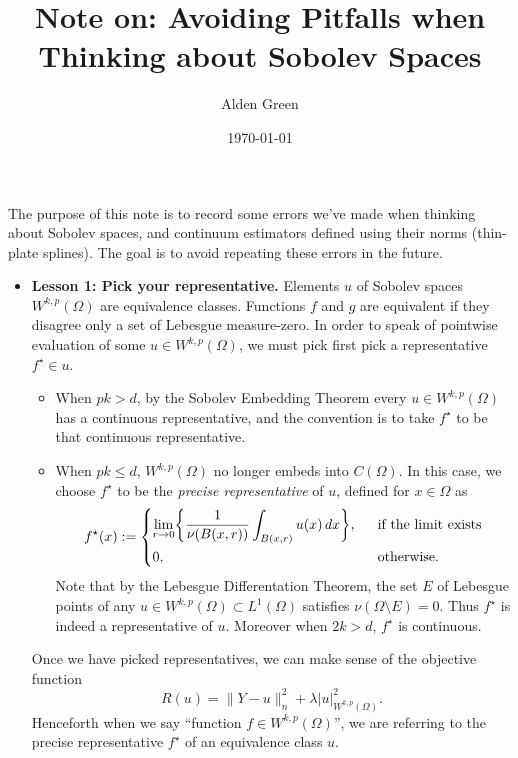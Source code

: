 \documentclass{article}
\newcommand{\1}{\mathbf{1}}
\theoremstyle{alden}
\theoremstyle{aldenthm}
\theoremstyle{definition}
\theoremstyle{remark}
\begin{document}
\title{Note on: Avoiding Pitfalls when Thinking about Sobolev Spaces}
\author{Alden Green}
\date{\today}
\maketitle

The purpose of this note is to record some errors we've made when thinking about Sobolev spaces, and continuum estimators defined using their norms (thin-plate splines). The goal is to avoid repeating these errors in the future.

\begin{itemize}
	\item \textbf{Lesson 1: Pick your representative.} Elements $u$ of Sobolev spaces $W^{k,p}(\Omega)$ are equivalence classes. Functions $f$ and $g$ are equivalent if they disagree only a set of Lebesgue measure-zero. In order to speak of pointwise evaluation of some $u \in W^{k,p}(\Omega)$, we must pick first pick a representative $f^{\star} \in u$. 
	\begin{itemize}
		\item When $pk > d$, by the Sobolev Embedding Theorem every $u \in W^{k,p}(\Omega)$ has a continuous representative, and the convention is to take $f^{\star}$ to be that continuous representative.
		\item When $pk \leq d$, $W^{k,p}(\Omega)$ no longer embeds into $C(\Omega)$. In this case, we choose $f^{\star}$ to be the \emph{precise representative} of $u$, defined for $x \in \Omega$ as
		\begin{equation*}
		f^{\star}(x) :=
		\begin{dcases}
		\lim_{r \to 0} \biggl\{\frac{1}{\nu(B(x,r))} \int_{B(x,r)} u(x) \,dx\biggr\},& ~~\textrm{if the limit exists} \\
		0,& ~~\textrm{otherwise.}
		\end{dcases}
		\end{equation*}
		Note that by the Lebesgue Differentation Theorem, the set $E$ of Lebesgue points of any $u \in W^{k,p}(\Omega) \subset L^1(\Omega)$ satisfies $\nu(\Omega\setminus E) = 0$. Thus $f^{\star}$ is indeed a representative of $u$. Moreover when $2k > d$, $f^{\star}$ is continuous. 
	\end{itemize}
	Once we have picked representatives, we can make sense of the objective function
	\begin{equation*}
	R(u) = \|Y - u\|_n^2 + \lambda |u|_{W^{k,p}(\Omega)}^2.
	\end{equation*}
	Henceforth when we say ``function $f \in W^{k,p}(\Omega)$'', we are referring to the precise representative $f^{\star}$ of an equivalence class $u$.

\end{itemize}
\end{document}
